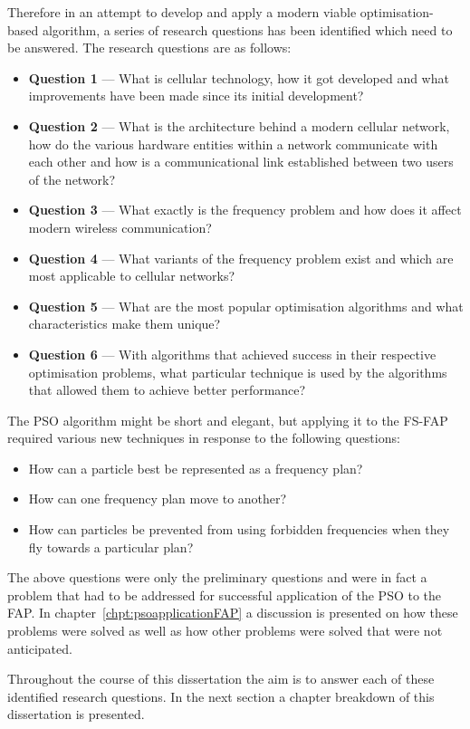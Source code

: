 Therefore in an attempt to develop and apply a modern viable optimisation-based algorithm, a series of research questions has been identified which need to be answered. The research questions are as follows:
\begin{itemize}
\item \textbf{Question 1} --- What is cellular technology, how it got developed and what improvements have been made since its initial development?
\item \textbf{Question 2} --- What is the architecture behind a modern cellular network, how do the various hardware entities within a network communicate with each other and how is a communicational link established between two users of the network?
\item \textbf{Question 3} --- What exactly is the frequency problem and how does it affect modern wireless communication?
\item \textbf{Question 4} --- What variants of the frequency problem exist and which are most applicable to cellular networks?
\item \textbf{Question 5} --- What are the most popular optimisation algorithms and what characteristics make them unique?
\item \textbf{Question 6} --- With algorithms that achieved success in their respective optimisation problems, what particular technique is used by the algorithms that allowed them to achieve better performance?
\end{itemize}

The PSO algorithm might be short and elegant, but applying it to the FS-FAP required various new techniques in response to the following questions:
\begin{itemize}
\item How can a particle best be represented as a frequency plan?
\item How can one frequency plan move to another?
\item How can particles be prevented from using forbidden frequencies when they fly towards a particular plan?
\end{itemize}

The above questions were only the preliminary questions and were in fact a problem that had to be addressed for successful application of the PSO to the FAP. In chapter~\ref{chpt:psoapplicationFAP} a discussion is presented on how these problems were solved as well as how other problems were solved that were not anticipated.

Throughout the course of this dissertation the aim is to answer each of these identified research questions. In the next section a chapter breakdown of this dissertation is presented.

